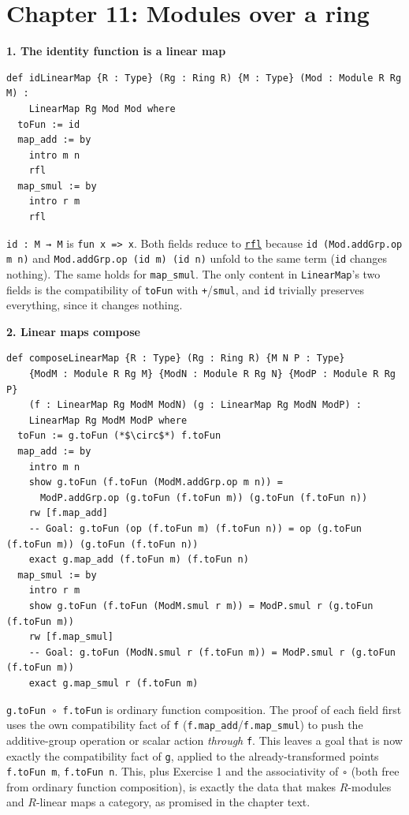 \section{Chapter 11: Modules over a ring}\label{sec:15-appendix-solutions:10-chapter-11:1}

\textbf{1. The identity function is a linear map}

\begin{lstlisting}
def idLinearMap {R : Type} (Rg : Ring R) {M : Type} (Mod : Module R Rg M) :
    LinearMap Rg Mod Mod where
  toFun := id
  map_add := by
    intro m n
    rfl
  map_smul := by
    intro r m
    rfl
\end{lstlisting}

\texttt{id : M → M} is \texttt{fun x => x}. Both fields reduce to \href{https://lean-lang.org/doc/reference/latest/Tactic-Proofs/Tactic-Reference/}{\texttt{rfl}} because \texttt{id (Mod.addGrp.op m n)} and \texttt{Mod.addGrp.op (id m) (id n)} unfold to the same term (\texttt{id} changes nothing). The same holds for \texttt{map\_\allowbreak{}smul}. The only content in \texttt{LinearMap}'s two fields is the compatibility of \texttt{toFun} with \texttt{+}/\texttt{smul}, and \texttt{id} trivially preserves everything, since it changes nothing.

\textbf{2. Linear maps compose}

\begin{lstlisting}
def composeLinearMap {R : Type} (Rg : Ring R) {M N P : Type}
    {ModM : Module R Rg M} {ModN : Module R Rg N} {ModP : Module R Rg P}
    (f : LinearMap Rg ModM ModN) (g : LinearMap Rg ModN ModP) :
    LinearMap Rg ModM ModP where
  toFun := g.toFun (*$\circ$*) f.toFun
  map_add := by
    intro m n
    show g.toFun (f.toFun (ModM.addGrp.op m n)) =
      ModP.addGrp.op (g.toFun (f.toFun m)) (g.toFun (f.toFun n))
    rw [f.map_add]
    -- Goal: g.toFun (op (f.toFun m) (f.toFun n)) = op (g.toFun (f.toFun m)) (g.toFun (f.toFun n))
    exact g.map_add (f.toFun m) (f.toFun n)
  map_smul := by
    intro r m
    show g.toFun (f.toFun (ModM.smul r m)) = ModP.smul r (g.toFun (f.toFun m))
    rw [f.map_smul]
    -- Goal: g.toFun (ModN.smul r (f.toFun m)) = ModP.smul r (g.toFun (f.toFun m))
    exact g.map_smul r (f.toFun m)
\end{lstlisting}

\texttt{g.toFun ∘ f.toFun} is ordinary function composition. The proof of each field first uses the own compatibility fact of \texttt{f} (\texttt{f.map\_\allowbreak{}add}/\texttt{f.map\_\allowbreak{}smul}) to push the additive-group operation or scalar action \emph{through} \texttt{f}. This leaves a goal that is now exactly the compatibility fact of \texttt{g}, applied to the already-transformed points \texttt{f.toFun m}, \texttt{f.toFun n}. This, plus Exercise 1 and the associativity of \texttt{∘} (both free from ordinary function composition), is exactly the data that makes \(R\)-modules and \(R\)-linear maps a category, as promised in the chapter text.


